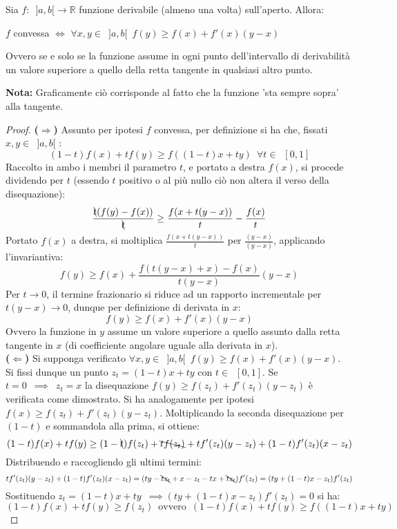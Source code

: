\documentclass[10pt, oneside]{book}
\theoremstyle{plain}
\begin{document}
\begin{ther}
Sia $f : \enspace ]a, b[ \rightarrow \mathbb{R}$ funzione derivabile (almeno una volta) sull'aperto. Allora:
\begin{center}
    $f$ convessa $\Longleftrightarrow$ $\forall x,y \in \enspace ]a, b[ \enspace f(y) \geq f(x) + f'(x) (y-x)$\\
\end{center}
Ovvero se e solo se la funzione assume in ogni punto dell'intervallo di derivabilità un valore superiore a quello della retta tangente in qualsiasi altro punto.
\end{ther}
\textbf{Nota:} Graficamente ciò corrisponde al fatto che la funzione 'sta sempre sopra' alla tangente. 
\begin{proof}
\textbf{($\Rightarrow$)} Assunto per ipotesi $f$ convessa, per definizione si ha che, fissati $x, y \in \enspace ]a, b[$ : 
\[(1-t) f(x) + t f(y) \geq f((1-t) x + t y) \enspace \forall t \in \enspace [0, 1]\]
Raccolto in ambo i membri il parametro $t$, e portato a destra $f(x)$, si procede dividendo per $t$ (essendo $t$ positivo o al più nullo ciò non altera il verso della disequazione):
\[\frac{\bcancel{t} (f(y) - f(x))}{\bcancel{t}} \geq \frac{f(x + t (y - x))}{t} - \frac{f(x)}{t}\]
Portato $f(x)$ a destra, si moltiplica $\frac{f(x + t (y - x))}{t}$ per $\frac{(y - x)}{(y - x)}$, applicando l'invariantiva:
\[f(y) \geq f(x) + \frac{f(t(y-x) + x) - f(x)}{t (y-x)}(y - x)\]
Per $t \rightarrow 0$, il termine frazionario si riduce ad un rapporto incrementale per $t (y - x) \rightarrow 0$, dunque per definizione di derivata in $x$:
\[f(y) \geq f(x) + f'(x) (y - x)\]
Ovvero la funzione in $y$ assume un valore superiore a quello assunto dalla retta tangente in $x$ (di coefficiente angolare uguale alla derivata in $x$).\\
\textbf{($\Leftarrow$)} Si supponga verificato $\forall x, y \in \enspace ]a, b[ \enspace f(y) \geq f(x) + f'(x) (y - x)$.
\\Si fissi dunque un punto $z_t = (1 - t) x + t y$ con $t \in \enspace [0,1]$. Se $t = 0 \enspace \implies \enspace z_t = x$ la disequazione $f(y) \geq f(z_t) + f'(z_t) (y - z_t)$ è verificata come dimostrato. Si ha analogamente per ipotesi $f(x) \geq f(z_t) + f'(z_t) (y - z_t)$. Moltiplicando la seconda disequazione per $(1 - t)$ e sommandola alla prima, si ottiene:
\[(1-t) f(x) + t f(y) \geq (1-\bcancel{t}) f(z_t) + \bcancel{t f(z_t)}+ t f'(z_t) (y - z_t) + (1 - t) f'(z_t) (x - z_t)\]
Distribuendo e raccogliendo gli ultimi termini:
\[t f'(z_t) (y - z_t) + (1 - t) f'(z_t) (x - z_t) = (t y - \bcancel{t z_t} + x - z_t - t x + \bcancel{t z_t}) f'(z_t) = (t y + (1-t) x - z_t) f'(z_t)\]
Sostituendo $z_t = (1 - t) x + t y \enspace \implies (t y + (1-t) x - z_t) f'(z_t) = 0$ si ha:
\[(1- t) f(x) + t f(y) \geq f(z_t) \enspace \textrm{ovvero} \enspace (1-t) f(x) + t f(y) \geq f((1-t) x + t y)\]
\end{proof}
\end{document}
